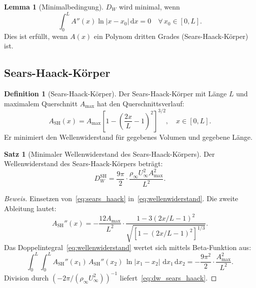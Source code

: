 ﻿\documentclass[12pt,a4paper]{article}
\theoremstyle{definition}
\newtheorem{definition}{Definition}[section]
\newtheorem{satz}{Satz}[section]
\newtheorem{lemma}{Lemma}[section]
\theoremstyle{remark}
\newenvironment{beweis}{\begin{proof}[Beweis]}{\end{proof}}
\newcommand{\dd}{\,\mathrm{d}}
\begin{document}
\begin{lemma}[Minimalbedingung]
  \label{lemma:minmal}
  $D_W$ wird minimal, wenn
  \begin{equation}
    \int_0^L A''(x) \ln|x - x_0| \dd x = 0 \quad \forall\, x_0 \in [0, L].
    \label{eq:minimalbedingung}
  \end{equation}
  Dies ist erfüllt, wenn $A(x)$ ein Polynom dritten Grades (Sears-Haack-Körper) ist.
\end{lemma}

\subsection{Sears-Haack-Körper}

\begin{definition}[Sears-Haack-Körper]
  Der Sears-Haack-Körper mit Länge $L$ und maximalem Querschnitt $A_{\max}$ hat den
  Querschnittsverlauf:
  \begin{equation}
    A_\text{SH}(x) = A_{\max} \left[1 - \left(\frac{2x}{L} - 1\right)^2\right]^{3/2},
    \quad x \in [0, L].
    \label{eq:sears_haack}
  \end{equation}
  Er minimiert den Wellenwiderstand für gegebenes Volumen und gegebene Länge.
\end{definition}

\begin{satz}[Minimaler Wellenwiderstand des Sears-Haack-Körpers]
  \label{satz:sears_haack}
  Der Wellenwiderstand des Sears-Haack-Körpers beträgt:
  \begin{equation}
    D_W^\text{SH} = \frac{9\pi}{2} \cdot \frac{\rho_\infty U_\infty^2 A_{\max}^2}{L^2}.
    \label{eq:dw_sears_haack}
  \end{equation}
\end{satz}

\begin{beweis}
  Einsetzen von~\eqref{eq:sears_haack} in~\eqref{eq:wellenwiderstand}. Die zweite Ableitung
  lautet:
  \begin{equation}
    A_\text{SH}''(x) = -\frac{12 A_{\max}}{L^2} \cdot
    \frac{1 - 3(2x/L - 1)^2}{\sqrt{[1-(2x/L-1)^2]^{1/3}}}.
  \end{equation}
  Das Doppelintegral~\eqref{eq:wellenwiderstand} wertet sich mittels Beta-Funktion aus:
  \begin{equation}
    \int_0^L \int_0^L A_\text{SH}''(x_1)\, A_\text{SH}''(x_2)\, \ln|x_1 - x_2|\, \dd x_1 \dd x_2
    = -\frac{9\pi^2}{2}\cdot\frac{A_{\max}^2}{L^2}.
  \end{equation}
  Division durch $(-2\pi/(\rho_\infty U_\infty^2))^{-1}$ liefert~\eqref{eq:dw_sears_haack}.
  \qedhere
\end{beweis}
\end{document}
